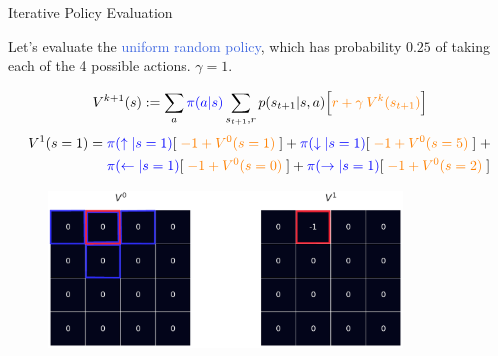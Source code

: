 \documentclass{beamer}
\begin{document}
\begin{frame}{Iterative Policy Evaluation}

\begin{footnotesize}

Let's evaluate the \textcolor{RoyalBlue}{uniform random policy}, which has probability $0.25$ of taking each of the 4 possible actions. $\gamma = 1$.

\begin{align*}
    V^{k+1}(s) := \sum_a \textcolor{blue}{\pi(a|s)} \sum_{s_{t+1},r} p(s_{t+1}|s,a)\Big[\textcolor{orange}{r+\gamma\:V^k(s_{t+1})}\Big]
\end{align*}
\begin{align*}
	V^1(s = 1) = \; & \textcolor{blue}{\pi(\uparrow|s=1)}[\;\textcolor{orange}{-1 + V^0(s=1)}\;] + \textcolor{blue}{\pi(\downarrow|s=1)}[\; \textcolor{orange}{-1+ V^0(s=5)}\; ] \; + \\
	&\textcolor{blue}{\pi(\leftarrow|s=1)}[\;\textcolor{orange}{-1+ V^0(s=0)}\;] + \textcolor{blue}{\pi(\rightarrow|s=1)}[\;\textcolor{orange}{-1+ V^0(s=2)}\;]
\end{align*}

\end{footnotesize}

\begin{figure}[t]
\includegraphics[width=9.4cm]{./images/step00.png}
\centering
\end{figure}

\end{frame}
\end{document}
